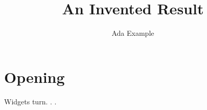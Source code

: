 \documentclass[review,12pt,twocolumn]{inventedletters}
\title{An Invented Result}
\author{Ada Example}
\begin{document}
\maketitle
\section{Opening}
Widgets turn. \journalname. \reviewmark.
\end{document}
